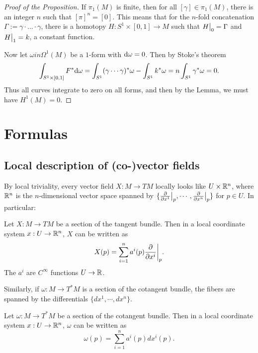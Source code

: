 \documentclass[11pt, english]{article}
\begin{document}
\begin{proof}[Proof of the Proposition]
If $\pi_1(M)$ is finite, then for all $[\gamma] \in \pi_1(M)$, there is an integer $n$ such that $[\pi]^n = [0]$. This means that for the $n$-fold concatenation $\Gamma := \gamma \cdot \ldots \cdot \gamma$, there is a homotopy $H:S^1 \times [0,1] \to M$ such that $\restr{H}{0}=\Gamma$ and $\restr{H}{1}=k$, a constant function. 

Now let $\omega in \Omega^1(M)$ be a $1$-form with $\mathrm{d}{\omega} = 0$. Then by Stoke's theorem
\[
\int_{S^1 \times [0,1]} F^\ast \mathrm{d}{\omega} = \int_{S^1} (\gamma \cdots \gamma)^\ast \omega - \int_{S^1} k^\ast \omega = n \int_{S^1} \gamma^\ast \omega = 0.
\]
Thus all curves integrate to zero on all forms, and then by the Lemma, we must have $H^1(M)=0$.
\end{proof}



\newpage
\appendix
\section{Formulas}
 
\subsection{Local description of (co-)vector fields}

By local triviality, every vector field $X:M \to TM$ locally looks like $U \times \mathbb{R}^n$, where $\mathbb{R}^n$ is the $n$-dimensional vector space spanned by $\{ \restr{\dd{}{x^1}}{p},\cdots,\restr{\dd{}{x^n}}{p} \}$ for $p \in U$. In particular:

\begin{prop}
\label{Xtriv}
Let $X:M \to TM$ be a section of the tangent bundle. Then in a local coordinate system $x:U \to \mathbb{R}^n$, $X$ can be written as
\[
X(p) = \sum_{i=1}^n  a^i(p) \restr{\dd{}{x^i}}{p}.
\]
The $a^i$ are $C^\infty$ functions $U \to \mathbb{R}$.
\end{prop}

Similarly, if $\omega:M \to T^\ast M$ is a section of the cotangent bundle, the fibers are spanned by the differentials $\{dx^1,\cdots, dx^n \}$.

\begin{prop}
Let $\omega:M \to T^\ast M$ be a section of the cotangent bundle. Then in a local coordinate system $x:U \to \mathbb{R}^n$, $\omega$ can be written as
\[
\omega(p) = \sum_{i=1}^n a^i(p) dx^i(p).
\]
\end{prop}
\end{document}
